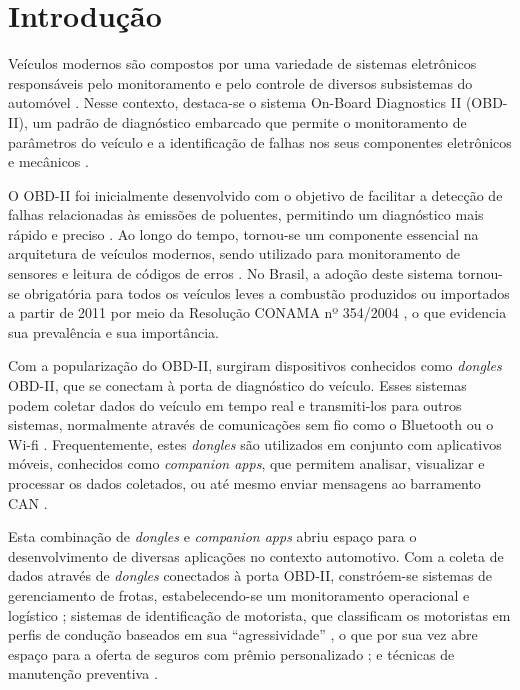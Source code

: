 
\chapter{Introdução} \label{cap:intro}

Veículos modernos são compostos por uma variedade de sistemas eletrônicos responsáveis pelo monitoramento e pelo controle de diversos subsistemas do automóvel \cite{sonko2024embedded}. Nesse contexto, destaca-se o sistema On-Board Diagnostics II (OBD-II), um padrão de diagnóstico embarcado que permite o monitoramento de parâmetros do veículo e a identificação de falhas nos seus componentes eletrônicos e mecânicos \cite{csselectronics_obd2_intro}. 

O OBD-II foi inicialmente desenvolvido com o objetivo de facilitar a detecção de falhas relacionadas às emissões de poluentes, permitindo um diagnóstico mais rápido e preciso \cite{sonko2024embedded}.  Ao longo do tempo, tornou-se um componente essencial na arquitetura de veículos modernos, sendo utilizado para monitoramento de sensores e leitura de códigos de erros \cite{csselectronics_obd2_intro}. No Brasil, a adoção deste sistema tornou-se obrigatória para todos os veículos leves a combustão produzidos ou importados a partir de 2011 por meio da Resolução CONAMA nº 354/2004 \cite{conama354_2004}, o que evidencia sua prevalência e sua importância.

Com a popularização do OBD-II, surgiram dispositivos conhecidos como \textit{dongles} OBD-II, que se conectam à porta de diagnóstico do veículo. Esses sistemas podem coletar dados do veículo em tempo real e transmiti-los para outros sistemas, normalmente através de comunicações sem fio como o Bluetooth ou o Wi-fi \cite{wen2020plugnpwned}. Frequentemente, estes \textit{dongles} são utilizados em conjunto com aplicativos móveis, conhecidos como \textit{companion apps}, que permitem analisar, visualizar e processar os dados coletados, ou até mesmo enviar mensagens ao barramento CAN \cite{companionapps2024security}.

Esta combinação de \textit{dongles} e \textit{companion apps} abriu espaço para o desenvolvimento de diversas aplicações no contexto automotivo. Com a coleta de dados através de \textit{dongles} conectados à porta OBD-II, constróem-se sistemas de gerenciamento de frotas, estabelecendo-se um monitoramento operacional e logístico  \cite{malekian2017fleet}; sistemas de identificação de motorista, que classificam os motoristas em perfis de condução baseados em sua “agressividade” \cite{barreto2018perfis}, o que por sua vez abre espaço para a oferta de seguros com prêmio personalizado \cite{michailidis2025mlobd}; e técnicas de manutenção preventiva  \cite{errezgouny2025predictive}.

